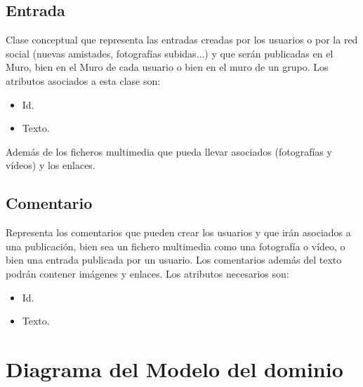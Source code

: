 \documentclass[12pt, a4paper, titlepage]{article}
\begin{document}
\subsection{Entrada}
	Clase conceptual que representa las entradas creadas por los usuarios o por la red social (nuevas amistades, fotografías subidas...) y que serán publicadas en el Muro, bien en el Muro de cada usuario o bien en el muro de un grupo. 
	Los atributos asociados a esta clase son:
	\begin{itemize}
		\item Id.
		\item Texto.
	\end{itemize}
	Además de los ficheros multimedia que pueda llevar asociados (fotografías y vídeos) y los enlaces.
\subsection{Comentario}
	Representa los comentarios que pueden crear los usuarios y que irán asociados a una publicación, bien sea un fichero multimedia como una fotografía o vídeo, o bien una entrada publicada por un usuario. Los comentarios además del texto podrán contener imágenes y enlaces.
	Los atributos necesarios son:
	\begin{itemize}
		\item Id.
		\item Texto.
	\end{itemize}


\section{Diagrama del Modelo del dominio}

\end{document}
